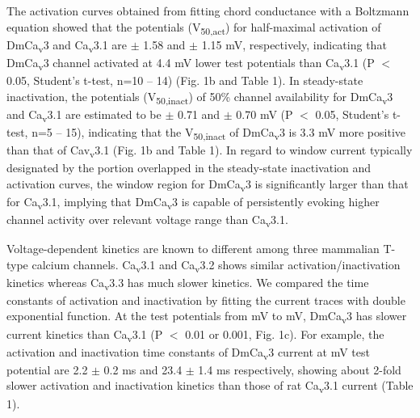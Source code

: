 The activation curves obtained from fitting chord conductance with a Boltzmann equation showed that the potentials (V\textsubscript{50,act}) for half-maximal activation of DmCa\textsubscript{v}3 and Ca\textsubscript{v}3.1 are  $\pm$ 1.58 and  $\pm$ 1.15 mV, respectively, indicating that DmCa\textsubscript{v}3 channel activated at 4.4 mV lower test potentials than Ca\textsubscript{v}3.1 (P $<$ 0.05, Student's t-test, n=10 -- 14) (Fig. 1b and Table 1).
In steady-state inactivation, the potentials (V\textsubscript{50,inact}) of 50\% channel availability for DmCa\textsubscript{v}3 and Ca\textsubscript{v}3.1 are estimated to be  $\pm$ 0.71 and  $\pm$ 0.70 mV (P $<$ 0.05, Student's t-test, n=5 -- 15), indicating that the V\textsubscript{50,inact} of DmCa\textsubscript{v}3 is 3.3 mV more positive than that of Cav\textsubscript{v}3.1 (Fig. 1b and Table 1).
In regard to window current typically designated by the portion overlapped in the steady-state inactivation and activation curves, the window region for DmCa\textsubscript{v}3 is significantly larger than that for Ca\textsubscript{v}3.1, implying that DmCa\textsubscript{v}3 is capable of persistently evoking higher channel activity over relevant voltage range than Ca\textsubscript{v}3.1.

Voltage-dependent kinetics are known to different among three mammalian T-type calcium channels\cite{10594642}.
Ca\textsubscript{v}3.1 and Ca\textsubscript{v}3.2 shows similar activation/inactivation kinetics whereas Ca\textsubscript{v}3.3 has much slower kinetics.
We compared the time constants of activation and inactivation by fitting the current traces with double exponential function.
At the test potentials from  mV to  mV,  DmCa\textsubscript{v}3 has slower current kinetics than Ca\textsubscript{v}3.1 (P $<$ 0.01 or 0.001, Fig. 1c).
For example, the activation and inactivation time constants of DmCa\textsubscript{v}3 current at  mV test potential are 2.2 $\pm$ 0.2 ms and 23.4 $\pm$ 1.4 ms respectively, showing about 2-fold slower activation and inactivation kinetics than those of rat Ca\textsubscript{v}3.1 current (Table 1).

